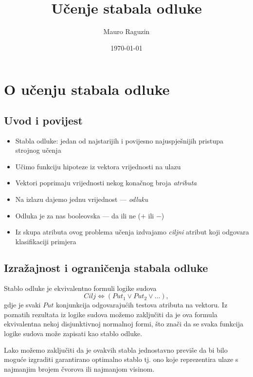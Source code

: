 \documentclass{beamer}
\author{Mauro Raguzin}
\title{Učenje stabala odluke}
\date{\today}
\begin{document}
\frame{\titlepage}

\section{O učenju stabala odluke}
\subsection{Uvod i povijest}
\begin{frame}
    \begin{itemize}
        \item Stabla odluke: jedan od najstarijih i povijesno najuspješnijih pristupa strojnog učenja
        \item Učimo funkciju hipoteze iz vektora vrijednosti na ulazu
        \item Vektori poprimaju vrijednosti nekog konačnog broja \emph{atributa}
        \item Na izlazu dajemo jednu vrijednost --- \emph{odluku}
        \item Odluka je za nas booleovska --- da ili ne ($+$ ili $-$)
        \item Iz skupa atributa ovog problema učenja izdvajamo \emph{ciljni} atribut koji odgovara klasifikaciji primjera
    \end{itemize}
\end{frame}

\subsection{Izražajnost i ograničenja stabala odluke}
\begin{frame}
Stablo odluke je ekvivalentno formuli logike sudova
\begin{equation*}
    Cilj\Leftrightarrow(Put_1\lor Put_2\lor\ldots),
\end{equation*}
gdje je svaki $Put$ konjunkcija odgovarajućih testova atributa na vektoru. Iz poznatih rezultata iz logike sudova možemo zaključiti
da je ova formula ekvivalentna nekoj disjunktivnoj normalnoj formi, što znači da se svaka funkcija logike sudova može zapisati
kao stablo odluke.

Lako možemo zaključiti da je ovakvih stabla jednostavno previše da bi bilo moguće izgraditi garantirano optimalno stablo tj. ono
koje reprezentira ulaze s najmanjim brojem čvorova ili najmanjom visinom. 
\end{frame}
\end{document}
